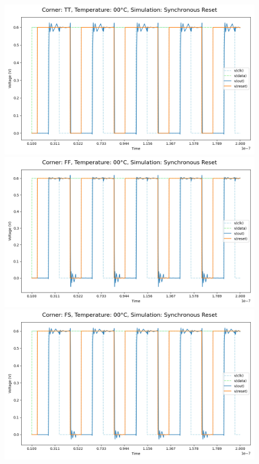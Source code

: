 \begin{figure}[H]
    \centering
    \includegraphics[height= 0.21\textheight]{figures/aimspice/TT00W3.png}
    \vspace{5pt}
    \includegraphics[height= 0.21\textheight]{figures/aimspice/FF00W3.png}
    \vspace{5pt}
    \includegraphics[height= 0.21\textheight]{figures/aimspice/FS00W3.png}

\end{figure}
